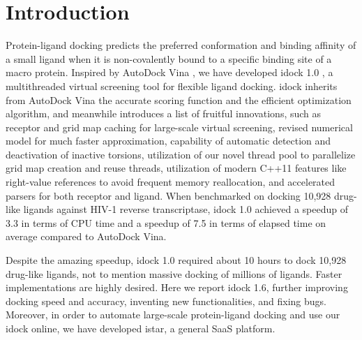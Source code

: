\documentclass{bioinfo}
\begin{document}
\section{Introduction}

Protein-ligand docking predicts the preferred conformation and binding affinity of a small ligand when it is non-covalently bound to a specific binding site of a macro protein. Inspired by AutoDock Vina \citep{595}, we have developed idock 1.0 \citep{1153}, a multithreaded virtual screening tool for flexible ligand docking. idock inherits from AutoDock Vina the accurate scoring function and the efficient optimization algorithm, and meanwhile introduces a list of fruitful innovations, such as receptor and grid map caching for large-scale virtual screening, revised numerical model for much faster approximation, capability of automatic detection and deactivation of inactive torsions, utilization of our novel thread pool to parallelize grid map creation and reuse threads, utilization of modern C++11 features like right-value references to avoid frequent memory reallocation, and accelerated parsers for both receptor and ligand. When benchmarked on docking 10,928 drug-like ligands against HIV-1 reverse transcriptase, idock 1.0 achieved a speedup of 3.3 in terms of CPU time and a speedup of 7.5 in terms of elapsed time on average compared to AutoDock Vina.

Despite the amazing speedup, idock 1.0 required about 10 hours to dock 10,928 drug-like ligands, not to mention massive docking of millions of ligands. Faster implementations are highly desired. Here we report idock 1.6, further improving docking speed and accuracy, inventing new functionalities, and fixing bugs. Moreover, in order to automate large-scale protein-ligand docking and use our idock online, we have developed istar, a general SaaS platform.
\end{document}
